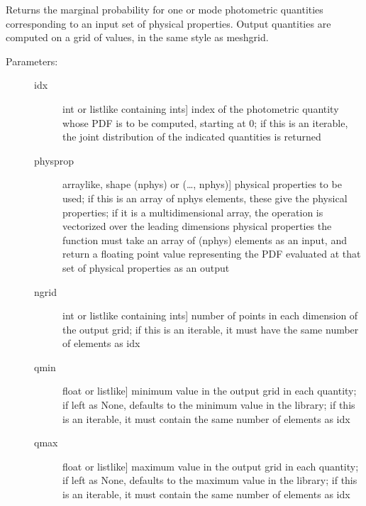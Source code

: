 \documentclass[letterpaper,10pt,english]{sphinxmanual}
\begin{document}
\begin{fulllineitems}
\begin{fulllineitems}
\begin{description}
\begin{description}
\end{description}

\end{description}

\end{fulllineitems}


\begin{fulllineitems}
\label{\detokenize{bayesphot:slugpy.bayesphot.bp.bp.mpdf_phot}}
Returns the marginal probability for one or mode photometric
quantities corresponding to an input set of physical
properties. Output quantities are computed on a grid of
values, in the same style as meshgrid.
\begin{description}
\item[{Parameters:}] \leavevmode\begin{description}
\item[{idx}] \leavevmode{[}int or listlike containing ints{]}
index of the photometric quantity whose PDF is to be
computed, starting at 0; if this is an iterable, the
joint distribution of the indicated quantities is returned

\item[{physprop}] \leavevmode{[}arraylike, shape (nphys) or (…, nphys){]}
physical properties to be used; if this is an array of
nphys elements, these give the physical properties; if
it is a multidimensional array, the operation is
vectorized over the leading dimensions
physical properties \textendash{} the function must take an array
of (nphys) elements as an input, and return a floating
point value representing the PDF evaluated at that set
of physical properties as an output

\item[{ngrid}] \leavevmode{[}int or listlike containing ints{]}
number of points in each dimension of the output grid;
if this is an iterable, it must have the same number of
elements as idx

\item[{qmin}] \leavevmode{[}float or listlike{]}
minimum value in the output grid in each quantity; if
left as None, defaults to the minimum value in the
library; if this is an iterable, it must contain the
same number of elements as idx

\item[{qmax}] \leavevmode{[}float or listlike{]}
maximum value in the output grid in each quantity; if
left as None, defaults to the maximum value in the
library; if this is an iterable, it must contain the
same number of elements as idx


\end{description}
\end{description}
\end{fulllineitems}
\end{fulllineitems}
\end{document}
